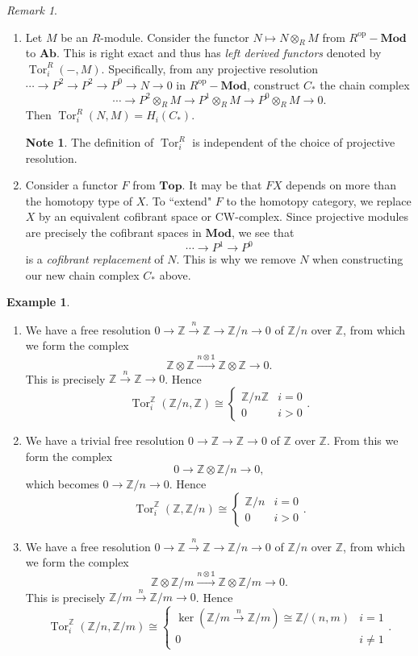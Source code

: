 \documentclass[10pt,letterpaper,cm]{nupset}
\theoremstyle{definition}
\newtheorem{exmp}[definition]{Example}
\newtheorem{note}[definition]{Note}
\theoremstyle{theorem}
\theoremstyle{remark}
\newtheorem{remark}[definition]{Remark}
\newcommand{\Z}{\mathbb Z}
\newcommand{\1}{\mathbb{1}}
\newcommand{\0}{\vec 0}
\DeclareMathOperator{\tor}{Tor}
\DeclareMathOperator{\op}{op}
\begin{document}
\begin{remark} $ $
\begin{enumerate}
\item  Let $M$ be an $R$-module. Consider the functor $N \mapsto N \otimes_R M$ from $R^{\op}{-}\mathbf{Mod}$ to $\mathbf{Ab}$. This is right exact and thus has \textit{left derived functors}  denoted by $\tor_i^R({-}, M)$.  Specifically, from any projective resolution $\cdots \to P^2 \to P^2 \to P^0 \to N\to 0$ in $R^{\op}{-}\mathbf{Mod}$, construct $C_{\ast}$ the chain complex $$\cdots  \to P^2 \otimes_R M\to  P^1 \otimes_R M\to  P^0 \otimes_R M  \to 0.$$ Then $\tor_i^R(N, M) = H_i(C_{\ast}).$
\begin{note}
The definition of $\tor_i^{R}$ is independent of the choice of projective resolution. 
\end{note}
\item Consider a functor $F$ from $\mathbf{Top}$. It may be that $FX$ depends on more than the homotopy type of $X$. To ``extend" $F$ to the homotopy category, we replace $X$ by an equivalent cofibrant space or CW-complex. Since projective modules are precisely the cofibrant spaces in $\mathbf{Mod}$, we see that $$ \cdots \to P^1 \to P^0$$ is a \textit{cofibrant replacement} of $N$. This is why we remove $N$ when constructing our new chain complex $C_{\ast}$ above.
\end{enumerate}
\end{remark}

\begin{exmp} $ $
\begin{enumerate}
\item We have a free resolution $0 \to \Z \overset{n}{\longrightarrow} \Z \to \Z/n \to 0$ of $\Z/n$ over $\Z$, from which we form the complex $$ \Z \otimes \Z \overset{n \otimes \1}{\longrightarrow} \Z \otimes \Z  \to 0   .$$ This is precisely $ \Z \overset{n}{\longrightarrow} \Z \to 0$. Hence $$\tor_i^{\Z}(\Z/n, \Z) \cong  \begin{cases} \Z/n\Z & i =0 \\ 0 & i >0 \end{cases} .$$
\item We have a trivial free resolution $0 \to \Z \to \Z \to 0$ of $\Z$ over $\Z$. From this we form the complex $$ 0 \to \Z \otimes \Z /n  \to 0, $$ which becomes $0 \to \Z/n \to 0$. Hence $$\tor_i^{\Z}(\Z, \Z/n) \cong  \begin{cases} \Z/n & i =0 \\ 0 & i >0 \end{cases} .$$
\item We have a free resolution $0 \to \Z \overset{n}{\longrightarrow} \Z \to \Z/n \to 0$ of $\Z/n$ over $\Z$, from which we form the complex $$ \Z \otimes \Z/m \overset{n \otimes \1}{\longrightarrow} \Z \otimes \Z/m  \to 0   .$$ This is precisely $ \Z/m \overset{n}{\longrightarrow} \Z/m \to 0$. Hence $$\tor^{\Z}_i(\Z/n, \Z/m) \cong \begin{cases} \ker( \Z/m \overset{n}{\longrightarrow} \Z/m) \cong  \Z/(n,m) & i =1 \\ 0 & i \ne 1 \end{cases}.$$
\end{enumerate}
\end{exmp}
\end{document}
